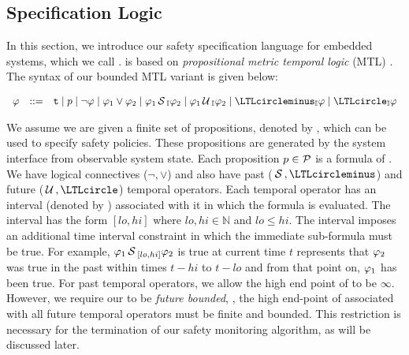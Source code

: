 \subsection{Specification Logic}
In this section, we introduce our safety specification language for embedded systems, which we call \planguage. \planguage is based on \emph{propositional metric temporal logic} (MTL) \cite{}. 
The syntax of our bounded MTL variant \planguage is given below:



\(
\begin{array}{ccc}
\policy & ::=  & \true \mid p \mid \neg \policy \mid \policy_1\vee \policy_2\mid
\policy_1\since_{\interval}\policy_2 \mid \policy_1\until_{\interval}\policy_2\mid\yesterday_{\interval}\policy\mid \tomorrow_{\interval}\policy
\end{array}
\)


We assume we are given a finite set of propositions, denoted by \cP, which can be used to specify safety policies. 
These propositions are generated by the system interface from observable system state.
Each proposition $p\in\mathcal{P}$ is a formula of \planguage. 
We have logical connectives ($\neg, \vee$) and also have past ($\since, \yesterday$) and future ($\until, \tomorrow$) temporal operators. 
Each temporal operator has an interval (denoted by \interval) associated with it in which the formula is evaluated. 
The interval has the form $[lo, hi]$ where $lo, hi\in\mathbb{N}$ and $lo\leq hi$. 
The interval imposes an additional time interval constraint in which the immediate sub-formula must be true. 
For example, $\varphi_1\,\mathrm{\cal S}\,_{[lo, hi]}\varphi_2$ is true at current time $t$ represents that $\varphi_2$ was true in the past within times $t-hi$ to $t-lo$  and from that point on, $\varphi_1$ has been true. 
For past temporal operators, we allow the high end point of \interval to be $\infty$. 
However, we require our \policy to be \emph{future bounded}, \ie, the high end-point of \interval associated with all future temporal operators must be finite and bounded. 
This restriction is necessary for the termination of our safety monitoring algorithm, as will be discussed later. 

